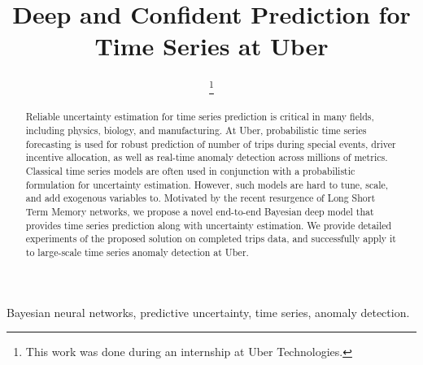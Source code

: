 \documentclass[conference,compsoc,final]{IEEEtran}
\begin{document}
\title{Deep and Confident Prediction for Time Series  at Uber}







\author{
\thanks{ This work was done during an internship at Uber Technologies.}
\and
{}
}












\maketitle

\begin{abstract}
Reliable uncertainty estimation for time series prediction is critical in many fields, including physics, biology, and manufacturing. 
At Uber,
probabilistic time series forecasting is used for robust prediction of number of trips during special events, driver incentive allocation, as well as real-time anomaly detection across millions of metrics. 
Classical time series models are often used in conjunction with a probabilistic formulation for uncertainty estimation. However, such models are hard to tune, scale, and add exogenous variables to.
Motivated by the recent resurgence of Long Short Term Memory networks, we propose a novel end-to-end Bayesian deep model that provides time series prediction along with uncertainty estimation.
We provide detailed experiments of the proposed solution on completed trips data, and successfully apply it to large-scale time series anomaly detection at Uber.
\end{abstract}

\begin{IEEEkeywords}
Bayesian neural networks, predictive uncertainty, time series, anomaly detection.
\end{IEEEkeywords}
\end{document}
